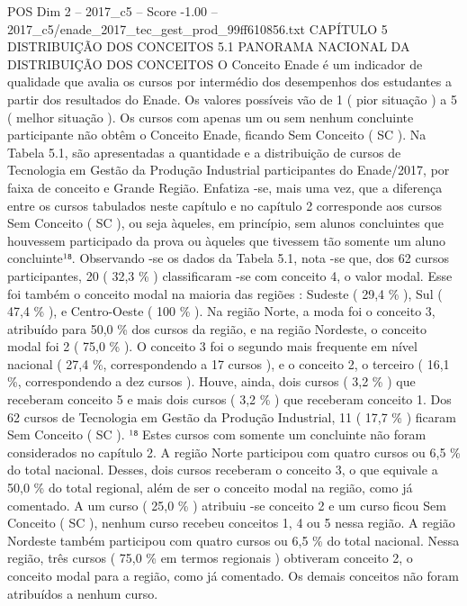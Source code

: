 \begin{textsample}{POS Dim 2 – 2017\_c5 – Score -1.00 – 2017\_c5/enade\_2017\_tec\_gest\_prod\_99ff610856.txt}  \label{ex:f2_pos_387}
CAPÍTULO 5 DISTRIBUIÇÃO DOS CONCEITOS 5.1 PANORAMA NACIONAL DA DISTRIBUIÇÃO DOS CONCEITOS O Conceito Enade é um indicador de qualidade que avalia os cursos por intermédio dos desempenhos dos estudantes a partir dos resultados do Enade.
Os valores possíveis vão de 1 ( pior situação ) a 5 ( melhor situação ).
Os cursos com apenas um ou sem nenhum concluinte participante não obtêm o Conceito Enade, ficando Sem Conceito ( SC ).
Na Tabela 5.1, são apresentadas a quantidade e a distribuição de cursos de Tecnologia em Gestão da Produção Industrial participantes do Enade/2017, por faixa de conceito e Grande Região.
Enfatiza -se, mais uma vez, que a diferença entre os cursos tabulados neste capítulo e no capítulo 2 corresponde aos cursos Sem Conceito ( SC ), ou seja àqueles, em princípio, sem alunos concluintes que houvessem participado da prova ou àqueles que tivessem tão somente um aluno concluinte¹⁸.
Observando -se os dados da Tabela 5.1, nota -se que, dos 62 cursos participantes, 20 ( 32,3 \% ) classificaram -se com conceito 4, o valor modal.
Esse foi também o conceito modal na maioria das regiões : Sudeste ( 29,4 \% ), Sul ( 47,4 \% ), e Centro-Oeste ( 100 \% ).
Na região Norte, a moda foi o conceito 3, atribuído para 50,0 \% dos cursos da região, e na região Nordeste, o conceito modal foi 2 ( 75,0 \% ).
O conceito 3 foi o segundo mais frequente em nível nacional ( 27,4 \%, correspondendo a 17 cursos ), e o conceito 2, o terceiro ( 16,1 \%, correspondendo a dez cursos ).
Houve, ainda, dois cursos ( 3,2 \% ) que receberam conceito 5 e mais dois cursos ( 3,2 \% ) que receberam conceito 1.
Dos 62 cursos de Tecnologia em Gestão da Produção Industrial, 11 ( 17,7 \% ) ficaram Sem Conceito ( SC ). ¹⁸ Estes cursos com somente um concluinte não foram considerados no capítulo 2.
A região Norte participou com quatro cursos ou 6,5 \% do total nacional.
Desses, dois cursos receberam o conceito 3, o que equivale a 50,0 \% do total regional, além de ser o conceito modal na região, como já comentado.
A um curso ( 25,0 \% ) atribuiu -se conceito 2 e um curso ficou Sem Conceito ( SC ), nenhum curso recebeu conceitos 1, 4 ou 5 nessa região.
A região Nordeste também participou com quatro cursos ou 6,5 \% do total nacional.
Nessa região, três cursos ( 75,0 \% em termos regionais ) obtiveram conceito 2, o conceito modal para a região, como já comentado.
Os demais conceitos não foram atribuídos a nenhum curso.

\end{textsample}
